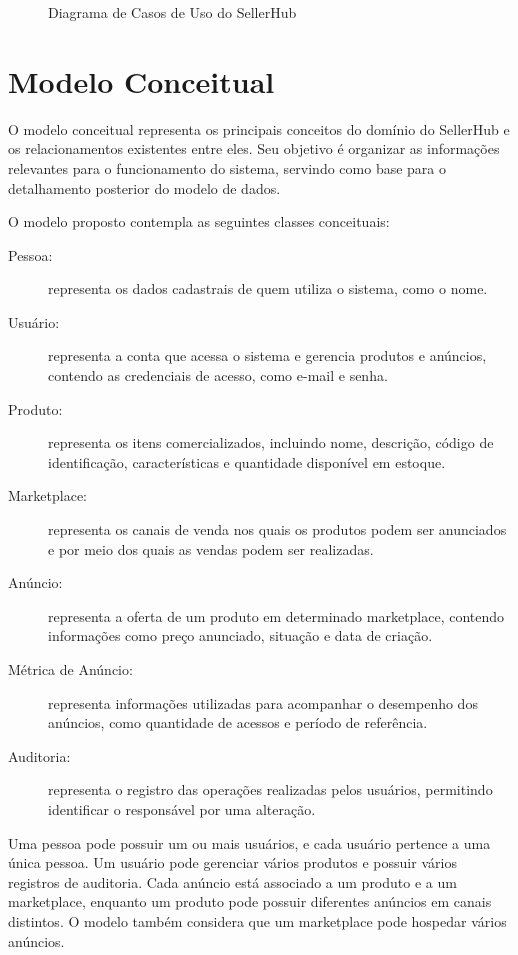 \begin{figure}[htbp]
    \centering
    \caption{Diagrama de Casos de Uso do SellerHub}
    \label{fig:casos_de_uso}
    \resizebox{\linewidth}{!}{}
\end{figure}

\section{Modelo Conceitual}

O modelo conceitual representa os principais conceitos do domínio do SellerHub e os relacionamentos existentes entre eles. Seu objetivo é organizar as informações relevantes para o funcionamento do sistema, servindo como base para o detalhamento posterior do modelo de dados.

O modelo proposto contempla as seguintes classes conceituais:

\begin{description}
    \item[Pessoa:] representa os dados cadastrais de quem utiliza o sistema, como o nome.
    \item[Usuário:] representa a conta que acessa o sistema e gerencia produtos e anúncios, contendo as credenciais de acesso, como e-mail e senha.
    \item[Produto:] representa os itens comercializados, incluindo nome, descrição, código de identificação, características e quantidade disponível em estoque.
    \item[Marketplace:] representa os canais de venda nos quais os produtos podem ser anunciados e por meio dos quais as vendas podem ser realizadas.
    \item[Anúncio:] representa a oferta de um produto em determinado marketplace, contendo informações como preço anunciado, situação e data de criação.
    \item[Métrica de Anúncio:] representa informações utilizadas para acompanhar o desempenho dos anúncios, como quantidade de acessos e período de referência.
    \item[Auditoria:] representa o registro das operações realizadas pelos usuários, permitindo identificar o responsável por uma alteração.
\end{description}

Uma pessoa pode possuir um ou mais usuários, e cada usuário pertence a uma única pessoa. Um usuário pode gerenciar vários produtos e possuir vários registros de auditoria. Cada anúncio está associado a um produto e a um marketplace, enquanto um produto pode possuir diferentes anúncios em canais distintos. O modelo também considera que um marketplace pode hospedar vários anúncios.

